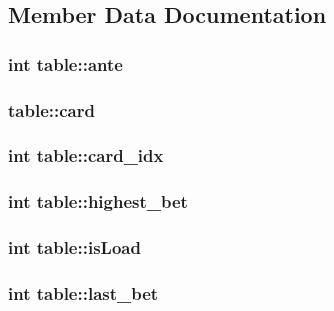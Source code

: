 \subsection{Member Data Documentation}
\hypertarget{structtable_a9bc7be4e5c17f0275b75764d87ac3af7}{
\subsubsection[{ante}]{\setlength{\rightskip}{0pt plus 5cm}int table\+::ante}}\label{structtable_a9bc7be4e5c17f0275b75764d87ac3af7}
\hypertarget{structtable_a4bcf571392db944947042f1faa90ad70}{
\subsubsection[{card}]{ table\+::card}}\label{structtable_a4bcf571392db944947042f1faa90ad70}
\hypertarget{structtable_ae74466d246cfcd247e0c4e49318edf8a}{
\subsubsection[{card\+\_\+idx}]{\setlength{\rightskip}{0pt plus 5cm}int table\+::card\+\_\+idx}}\label{structtable_ae74466d246cfcd247e0c4e49318edf8a}
\hypertarget{structtable_a50a5836f04eb5607ba290c98aa640767}{
\subsubsection[{highest\+\_\+bet}]{\setlength{\rightskip}{0pt plus 5cm}int table\+::highest\+\_\+bet}}\label{structtable_a50a5836f04eb5607ba290c98aa640767}
\hypertarget{structtable_ab1dd17260b838f195fd032c19bbd7ba5}{
\subsubsection[{is\+Load}]{\setlength{\rightskip}{0pt plus 5cm}int table\+::is\+Load}}\label{structtable_ab1dd17260b838f195fd032c19bbd7ba5}
\hypertarget{structtable_a4ca9edd8b9f6515674caaf6df7c621c0}{
\subsubsection[{last\+\_\+bet}]{\setlength{\rightskip}{0pt plus 5cm}int table\+::last\+\_\+bet}}\label{structtable_a4ca9edd8b9f6515674caaf6df7c621c0}
